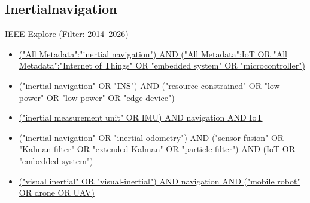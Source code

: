 \documentclass[
  a4paper,
  12pt,
  DIV=12,        %
  parskip=half,  %
  headings=small %
]{scrartcl}
\theoremstyle{definition}
\theoremstyle{definition}
\begin{document}
\subsection*{Inertialnavigation}

IEEE Explore (Filter: 2014--2026)
\begin{itemize}

   \item \href{https://ieeexplore.ieee.org/search/searchresult.jsp?action=search&newsearch=true&matchBoolean=true&queryText=(\%22All\%20Metadata\%22:\%22inertial\%20navigation\%22\%20)%20AND%20(%22All\%20Metadata\%22:IoT%20OR%20%22All\%20Metadata%22:%20%22Internet\%20of\%20Things%22%20%20OR%20%22embedded\%20system\%22%20OR%20%22microcontroller\%22)&ranges=2014_2026_Year}{("All Metadata":"inertial navigation") AND ("All Metadata":IoT OR "All Metadata":"Internet of Things" OR "embedded system" OR "microcontroller")}

    \item \href{https://ieeexplore.ieee.org/search/searchresult.jsp?action=search&newsearch=true&matchBoolean=true&queryText=(\%22inertial\%20navigation\%22\%20OR\%20\%22INS\%22)%20AND%20(\%22resource-constrained\%22\%20OR\%20\%22low-power\%22\%20OR\%20\%22low\%20power\%22\%20OR\%20\%22edge\%20device\%22)&ranges=2014_2026_Year}
    {("inertial navigation" OR "INS") AND ("resource-constrained" OR "low-power" OR "low power" OR "edge device")}

    \item \href{https://ieeexplore.ieee.org/search/searchresult.jsp?action=search&newsearch=true&matchBoolean=true&queryText=(\%22inertial\%20measurement\%20unit\%22\%20OR\%20IMU)%20AND%20navigation%20AND%20IoT&ranges=2014_2026_Year}
    {("inertial measurement unit" OR IMU) AND navigation AND IoT}

    \item \href{https://ieeexplore.ieee.org/search/searchresult.jsp?action=search&newsearch=true&matchBoolean=true&queryText=(\%22inertial\%20navigation\%22\%20OR\%20\%22inertial\%20odometry\%22)%20AND%20(\%22sensor\%20fusion\%22\%20OR\%20\%22Kalman\%20filter\%22\%20OR\%20\%22extended\%20Kalman\%22\%20OR\%20\%22particle\%20filter\%22)%20AND%20(IoT%20OR%20\%22embedded\%20system\%22)&ranges=2014_2026_Year}
    {("inertial navigation" OR "inertial odometry") AND ("sensor fusion" OR "Kalman filter" OR "extended Kalman" OR "particle filter") AND (IoT OR "embedded system")}

    \item \href{https://ieeexplore.ieee.org/search/searchresult.jsp?action=search&newsearch=true&matchBoolean=true&queryText=(\%22visual\%20inertial\%22\%20OR\%20\%22visual-inertial\%22)%20AND%20navigation%20AND%20(\%22mobile\%20robot\%22\%20OR%20drone%20OR%20UAV)&ranges=2014_2026_Year}
    {("visual inertial" OR "visual-inertial") AND navigation AND ("mobile robot" OR drone OR UAV)}

\end{itemize}
\end{document}
